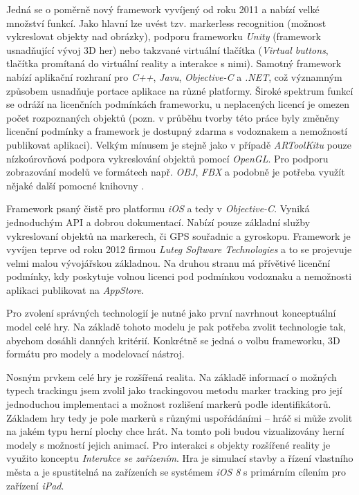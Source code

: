\documentclass[twoside,12pt]{article}
\begin{document}
Jedná se o poměrně nový framework vyvíjený od roku 2011 a nabízí velké množství funkcí. Jako hlavní lze uvést tzv. markerless recognition (možnost vykreslovat objekty nad obrázky), podporu frameworku \textit{Unity} (framework usnadňující vývoj 3D her) nebo takzvané virtuální tlačítka (\textit{Virtual buttons}, tlačítka promítaná do virtuální reality a interakce s nimi). Samotný framework nabízí aplikační rozhraní pro \textit{C++}, \textit{Javu}, \textit{Objective-C} a \textit{.NET}, což významným způsobem usnadňuje portace aplikace na různé platformy. Široké spektrum funkcí se odráží na licenčních podmínkách frameworku, u neplacených licencí je omezen počet rozpoznaných objektů (pozn. v průběhu tvorby této práce byly změněny licenční podmínky a framework je dostupný zdarma s vodoznakem a nemožností publikovat aplikaci). Velkým mínusem je stejně jako v případě \textit{ARToolKitu} pouze nízkoúrovňová podpora vykreslování objektů pomocí \textit{OpenGL}. Pro podporu zobrazování modelů ve formátech např. \textit{OBJ}, \textit{FBX} a podobně je potřeba využít nějaké další pomocné knihovny \cite{vuforia_3dformats}.

Framework psaný čistě pro platformu \textit{iOS} a tedy v \textit{Objective-C}. Vyniká jednoduchým API a dobrou dokumentací. Nabízí pouze základní služby vykreslovaní objektů na markerech, či GPS souřadnic a gyroskopu. Framework je vyvíjen teprve od roku 2012 firmou \textit{Luteg Software Technologies} a to se projevuje velmi malou vývojářskou základnou. Na druhou stranu má přívětivé licenční podmínky, kdy poskytuje volnou licenci pod podmínkou vodoznaku a nemožnosti aplikaci publikovat na \textit{AppStore}. 

\newpage
{}
Pro zvolení správných technologií je nutné jako první navrhnout konceptuální model celé hry. Na základě tohoto modelu je pak potřeba zvolit technologie tak, abychom dosáhli danných kritérií. Konkrétně se jedná o volbu frameworku, 3D formátu pro modely a modelovací nástroj.

Nosným prvkem celé hry je rozšířená realita. Na základě informací o možných typech trackingu jsem zvolil jako trackingovou metodu marker tracking pro její jednoduchou implementaci a možnost rozlišení markerů podle identifikátorů. Základem hry tedy je pole markerů s různými uspořádáními -- hráč si může zvolit na jakém typu herní plochy chce hrát. Na tomto poli budou vizualizovány herní modely s možností jejich animací. Pro interakci s objekty rozšířené reality je využito konceptu \textit{Interakce se zařízením}. Hra je simulací stavby a řízení vlastního města a je spustitelná na zařízeních se systémem \textit{iOS 8} s primárním cílením pro zařízení \textit{iPad}. 
\end{document}

